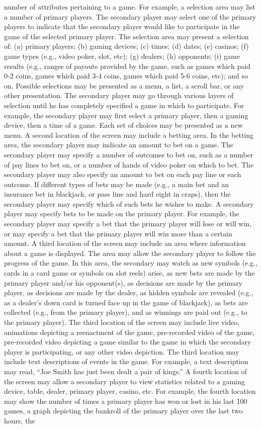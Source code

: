 \documentclass[11pt,a4paper]{article}
\begin{document}
number of attributes pertaining to a game. For example, a selection area may list a number of primary players. The secondary player may select one of the primary players to indicate that the secondary player would like to participate in the game of the selected primary player. The selection area may present a selection of: (a) primary players; (b) gaming devices; (c) times; (d) dates; (e) casinos; (f) game types (e.g., video poker, slot, etc); (g) dealers; (h) opponents; (i) game results (e.g., ranges of payouts provided by the game, such as games which paid 0-2 coins, games which paid 3-4 coins, games which paid 5-6 coins, etc); and so on. Possible selections may be presented as a menu, a list, a scroll bar, or any other presentation. The secondary player may go through various layers of selection until he has completely specified a game in which to participate. For example, the secondary player may first select a primary player, then a gaming device, then a time of a game. Each set of choices may be presented as a new menu. A second location of the screen may include a betting area. In the betting area, the secondary player may indicate an amount to bet on a game. The secondary player may specify a number of outcomes to bet on, such as a number of pay lines to bet on, or a number of hands of video poker on which to bet. The secondary player may also specify an amount to bet on each pay line or each outcome. If different types of bets may be made (e.g., a main bet and an insurance bet in blackjack, or pass line and hard eight in craps), then the secondary player may specify which of such bets he wishes to make. A secondary player may specify bets to be made on the primary player. For example, the secondary player may specify a bet that the primary player will lose or will win, or may specify a bet that the primary player will win more than a certain amount. A third location of the screen may include an area where information about a game is displayed. The area may allow the secondary player to follow the progress of the game. In this area, the secondary may watch as new symbols (e.g., cards in a card game or symbols on slot reels) arise, as new bets are made by the primary player and/or his opponent(s), as decisions are made by the primary player, as decisions are made by the dealer, as hidden symbols are revealed (e.g., as a dealer's down card is turned face up in the game of blackjack), as bets are collected (e.g., from the primary player), and as winnings are paid out (e.g., to the primary player). The third location of the screen may include live video, animations depicting a reenactment of the game, pre-recorded video of the game, pre-recorded video depicting a game similar to the game in which the secondary player is participating, or any other video depiction. The third location may include text descriptions of events in the game. For example, a text description may read, “Joe Smith has just been dealt a pair of kings.” A fourth location of the screen may allow a secondary player to view statistics related to a gaming device, table, dealer, primary player, casino, etc. For example, the fourth location may show the number of times a primary player has won or lost in his last 100 games, a graph depicting the bankroll of the primary player over the last two hours, the 
\end{document}
